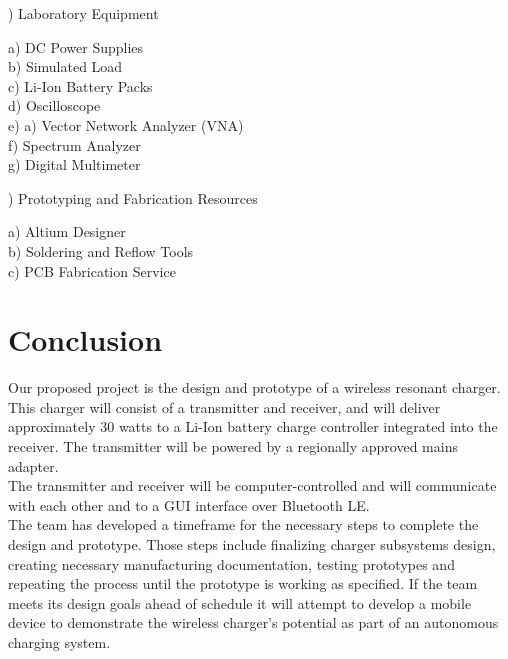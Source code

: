 \documentclass[12pt]{article}
\begin{document}
) Laboratory Equipment
\begin{addmargin}[0.50cm]{0.75cm}
a) DC Power Supplies\\
b) Simulated Load\\
c) Li-Ion Battery Packs \\
d) Oscilloscope\\
e) a) Vector Network Analyzer (VNA)\\
f) Spectrum Analyzer\\
g) Digital Multimeter 
\end{addmargin}

) Prototyping and Fabrication Resources
\begin{addmargin}[0.50cm]{0.75cm}
a) Altium Designer\\
b) Soldering and Reflow Tools\\
c) PCB Fabrication Service
\end{addmargin}

\pagebreak

\section{Conclusion}

\indent \indent
Our proposed project is the design and prototype of a wireless resonant charger. This charger will consist of a transmitter and receiver, and will deliver approximately 30 watts to a Li-Ion battery charge controller integrated into the receiver. The transmitter will be powered by a regionally approved mains adapter.\\

\indent
The transmitter and receiver will be computer-controlled and will communicate with each other and to a GUI interface over Bluetooth LE.\\

\indent
The team has developed a timeframe for the necessary steps to complete the design and prototype. Those steps include finalizing charger subsystems design, creating necessary manufacturing documentation, testing prototypes and repeating the process until the prototype is working as specified. If the team meets its design goals ahead of schedule it will attempt to develop a mobile device to demonstrate the wireless charger’s potential as part of an autonomous charging system.\\

\indent




\pagebreak
\end{document}
